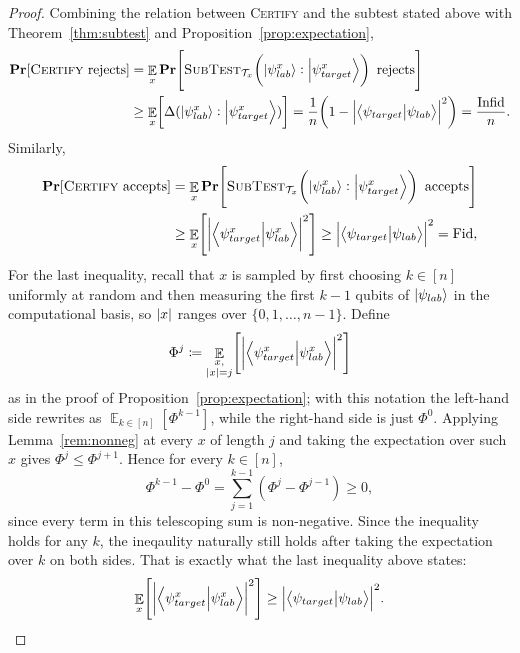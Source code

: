 \begin{proof}
    Combining the relation between \textsc{Certify} and the subtest stated above with Theorem~\ref{thm:subtest} and Proposition~\ref{prop:expectation},
    \begin{align*}
        \operatorname{{\bf Pr}}[\textsc{Certify}\text{ rejects}]
            &= \mathop{\mathbb{E}}_{x}\operatorname{{\bf Pr}}\!\left[\textsc{SubTest}_{\mathcal{T}_x}\!\left(\ket{\psi_{lab}^x}:\ket{\psi_{target}^x}\right)\text{ rejects}\right]\\
            &\geq \mathop{\mathbb{E}}_{x}\!\left[\Delta(\ket{\psi_{lab}^x}:\ket{\psi_{target}^x})\right]
            = \frac{1}{n}\!\left(1 - {\left| \braket{\psi_{target}}{\psi_{lab}} \right|}^2\right) = \frac{\mathrm{Infid}}{n}.
    \end{align*}
    Similarly,
    \begin{align*}
        \operatorname{{\bf Pr}}[\textsc{Certify}\text{ accepts}]
            &= \mathop{\mathbb{E}}_{x}\operatorname{{\bf Pr}}\!\left[\textsc{SubTest}_{\mathcal{T}_x}\!\left(\ket{\psi_{lab}^x}:\ket{\psi_{target}^x}\right)\text{ accepts}\right]\\
            &\geq \mathop{\mathbb{E}}_{x}\!\left[{\left| \braket{\psi_{target}^x}{\psi_{lab}^x} \right|}^2\right]
            \geq {\left| \braket{\psi_{target}}{\psi_{lab}} \right|}^2 = \mathrm{Fid},
    \end{align*}
    For the last inequality, recall that $x$ is sampled by first choosing $k\in[n]$ uniformly at random and then measuring the first $k-1$ qubits of $\ket{\psi_{lab}}$ in the computational basis, so ${\left| x \right|}$ ranges over $\{0, 1, \ldots, n-1\}$. Define
    \[
        \Phi^j \coloneqq \mathop{\mathbb{E}}_{\substack{x,\\{\left| x \right|}=j}}\!\left[{\left| \braket{\psi_{target}^{x}}{\psi_{lab}^{x}} \right|}^2\right]
    \]
    as in the proof of Proposition~\ref{prop:expectation}; 
    with this notation the left-hand side rewrites as $\mathop{\mathbb{E}}_{k\in[n]}\!\left[\Phi^{k-1}\right]$, 
    while the right-hand side is just $\Phi^0$. 
    Applying Lemma~\ref{rem:nonneg} at every $x$ of length $j$ 
    and taking the expectation over such $x$ gives $\Phi^j \leq \Phi^{j+1}$. Hence for every $k\in[n]$,
    \[
        \Phi^{k-1} - \Phi^0 = \sum_{j=1}^{k-1}\!\left(\Phi^j - \Phi^{j-1}\right) \geq 0,
    \]
    since every term in this telescoping sum is non-negative. 
    Since the inequality holds for any $k$, the ineqaulity naturally 
    still holds after taking the expectation over $k$ on both sides. 
    That is exactly what the last inequality above states:
    \[
        \mathop{\mathbb{E}}_{x} \!\left[{\left| \braket{\psi_{target}^x}{\psi_{lab}^x} \right|}^2\right] \geq {\left| \braket{\psi_{target}}{\psi_{lab}} \right|}^2. 
    \]
\end{proof}

